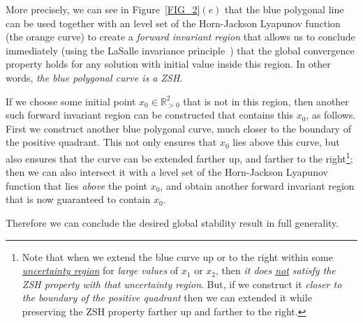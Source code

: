 \documentclass[12pt,letterpaper]{article}
\begin{document}
More precisely, we can see in Figure~\ref{FIG_2}$(e)$ that the blue polygonal line can be used together with an level set of the Horn-Jackson Lyapunov function (the orange curve)  to create a {\em forward invariant region} that allows us to conclude immediately  (using the LaSalle invariance principle~\cite{siegel_maclean, Sontag1, Extinction_in_reaction_networks}) that the global convergence property holds for any solution with initial value inside this region. In other words, {\em the blue polygonal curve is a ZSH}. 

If we choose some initial point $x_0 \in \mathbb{R}^2_{>0}$ that is not in this region, then 
another such forward invariant region can be constructed that contains this $x_0$, as follows. First we construct another blue  polygonal curve, much closer to the boundary of the positive quadrant. This not only ensures that $x_0$ lies above this curve, but also ensures that the curve can be extended farther up, and farther to the right\footnote{Note that when we extend the blue curve up or to the right within some \ul{\em uncertainty region} for {\em large values} of $x_1$ or $x_2$,  then {\em it does \ul{not} satisfy the ZSH property with that uncertainty region}. But, if we construct it {\em closer to the boundary of the positive quadrant} then we can extended it while preserving the ZSH property farther up and farther to the right.}; then we can also intersect it with a level set of the Horn-Jackson Lyapunov function that lies {\em above} the point $x_0$, and obtain another  forward invariant region that is now guaranteed to contain $x_0$.

\noindent
Therefore we can conclude the desired global stability result in full generality.

\bigskip
\end{document}
